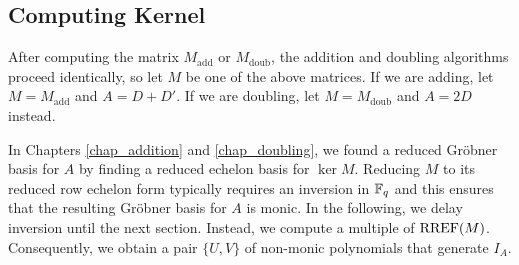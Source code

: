 
\subsection{Computing Kernel}

After computing the matrix $M_{\text{add}}$ or $M_{\text{doub}}$,
the addition and doubling algorithms proceed identically,
so let $M$ be one of the above matrices.
If we are adding, let $M = M_{\text{add}}$ and $A = D + D'$.
If we are doubling, let $M = M_{\text{doub}}$ and $A = 2D$ instead.

In Chapters \ref{chap_addition} and \ref{chap_doubling},
we found a reduced Gr\"obner basis for $A$ by finding a reduced echelon basis for $\ker M$.
Reducing $M$ to its reduced row echelon form typically requires an inversion in $\mathbb{F}_q$
and this ensures that the resulting Gr\"obner basis for $A$ is monic.
In the following, we delay inversion until the next section.
Instead, we compute a multiple of $\operatorname{RREF}(M)$.
Consequently, we obtain a pair $\{U,V\}$ of non-monic polynomials that generate $I_A$.


